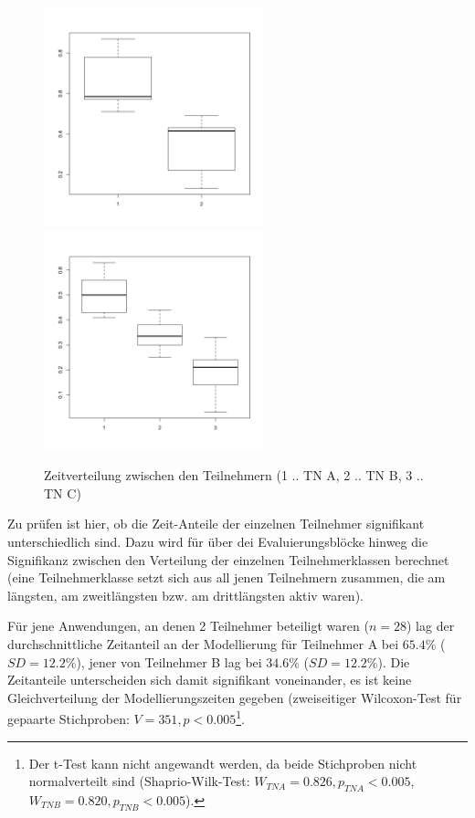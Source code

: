 \begin{figure}[htbp]
	\centering
		\includegraphics[height=2.5in]{img/Evaluierung/timeDist2TN.png}
		\includegraphics[height=2.5in]{img/Evaluierung/timeDist3TN.png}
	\caption[Zeitverteilung zwischen den Teilnehmern]{Zeitverteilung zwischen den Teilnehmern (1 .. TN A, 2 .. TN B, 3 .. TN C)}
	\label{fig:img_Evaluierung_timeDist}
\end{figure}

Zu prüfen ist hier, ob die Zeit-Anteile der einzelnen Teilnehmer signifikant unterschiedlich sind. Dazu wird für über dei Evaluierungsblöcke hinweg die Signifikanz zwischen den Verteilung der einzelnen Teilnehmerklassen berechnet (eine Teilnehmerklasse setzt sich aus all jenen Teilnehmern zusammen, die am längsten, am zweitlängsten bzw. am drittlängsten aktiv waren).

Für jene Anwendungen, an denen 2 Teilnehmer beteiligt waren ($n=28$) lag der durchschnittliche Zeitanteil an der Modellierung für Teilnehmer A bei $65.4\%$ ($SD=12.2\%$), jener von Teilnehmer B lag bei $34.6\%$ ($SD=12.2\%$). Die Zeitanteile unterscheiden sich damit signifikant voneinander, es ist keine Gleichverteilung der Modellierungszeiten gegeben (zweiseitiger Wilcoxon-Test für gepaarte Stichproben: $V=351, p<0.005$\footnote{Der t-Test kann nicht angewandt werden, da beide Stichproben nicht normalverteilt sind (Shaprio-Wilk-Test: $W_{TN A}=0.826, p_{TN A}<0.005$, $W_{TN B}=0.820, p_{TN B}<0.005$).}.


